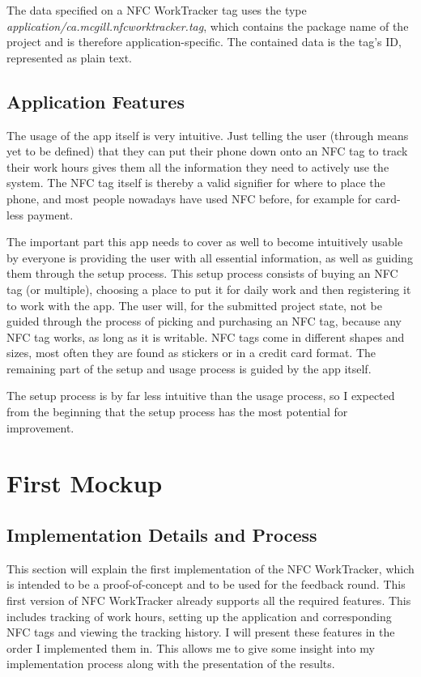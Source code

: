 \documentclass[conference]{IEEEtran}
\newcommand{\projectname}{NFC WorkTracker}
\begin{document}
The data specified on a \projectname{} tag uses the type \textit{application/ca.mcgill.nfcworktracker.tag}, which contains the package name of the project and is therefore application-specific. The contained data is the tag's ID, represented as plain text.

\subsection{Application Features}
The usage of the app itself is very intuitive. Just telling the user (through means yet to be defined) that they can put their phone down onto an NFC tag to track their work hours gives them all the information they need to actively use the system. The NFC tag itself is thereby a valid signifier for where to place the phone, and most people nowadays have used NFC before, for example for card-less payment.

The important part this app needs to cover as well to become intuitively usable by everyone is providing the user with all essential information, as well as guiding them through the setup process. This setup process consists of buying an NFC tag (or multiple), choosing a place to put it for daily work and then registering it to work with the app.
The user will, for the submitted project state, not be guided through the process of picking and purchasing an NFC tag, because any NFC tag works, as long as it is writable. NFC tags come in different shapes and sizes, most often they are found as stickers or in a credit card format. The remaining part of the setup and usage process is guided by the app itself.

The setup process is by far less intuitive than the usage process, so I expected from the beginning that the setup process has the most potential for improvement.

\section{First Mockup}
\subsection{Implementation Details and Process}
This section will explain the first implementation of the \projectname{}, which is intended to be a proof-of-concept and to be used for the feedback round. This first version of \projectname{} already supports all the required features. This includes tracking of work hours, setting up the application and corresponding NFC tags and viewing the tracking history. I will present these features in the order I implemented them in. This allows me to give some insight into my implementation process along with the presentation of the results.
\end{document}
